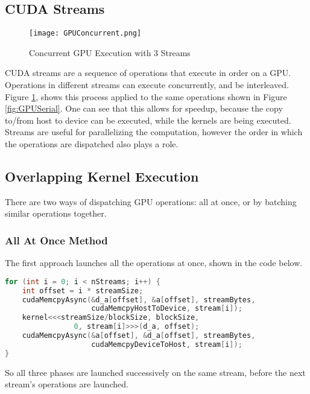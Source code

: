 \subsection{CUDA Streams}
\begin{figure}[htp]
\centering
\texttt{[image: GPUConcurrent.png]}
\caption{Concurrent GPU Execution with 3 Streams}
\label{fig:GPUConcurrent}
\end{figure}
CUDA streams are a sequence of operations that execute in order on a GPU. Operations in different streams can execute concurrently, and be interleaved. Figure \ref{fig:GPUConcurrent}, shows this process applied to the same operations shown in Figure \ref{fig:GPUSerial}. One can see that this allows for speedup, because the copy to/from host to device can be executed, while the kernels are being executed. Streams are useful for parallelizing the computation, however the order in which the operations are dispatched also plays a role.

\subsection{Overlapping Kernel Execution}
There are two ways of dispatching GPU operations: all at once, or by batching similar operations together.

\subsubsection{All At Once Method}
The first approach launches all the operations at once, shown in the code below.
\begin{lstlisting}[language=C++,caption={Operations launched all at once}]
for (int i = 0; i < nStreams; i++) {
    int offset = i * streamSize;
    cudaMemcpyAsync(&d_a[offset], &a[offset], streamBytes, 
                    cudaMemcpyHostToDevice, stream[i]);
    kernel<<<streamSize/blockSize, blockSize, 
                0, stream[i]>>>(d_a, offset);
    cudaMemcpyAsync(&a[offset], &d_a[offset], streamBytes, 
                    cudaMemcpyDeviceToHost, stream[i]);
}
\end{lstlisting}
So all three phases are launched successively on the same stream, before the next stream's operations are launched. 
